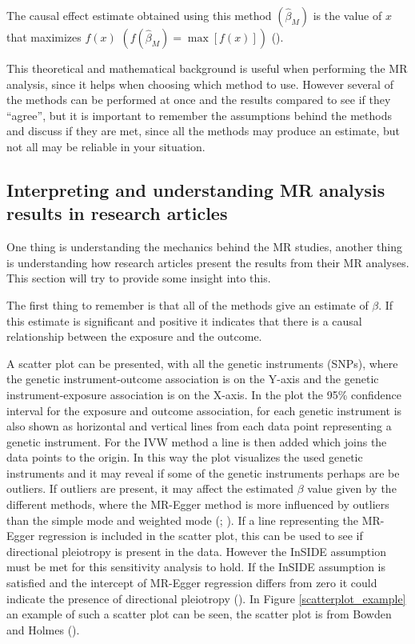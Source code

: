 \documentclass[
]{article}
\begin{document}
The causal effect estimate obtained using this method \((\hat\beta_M)\)
is the value of \(x\) that maximizes \(f(x)\)
\(\left(f\left(\hat\beta_M\right)=\max[f(x)]\right)\)
().

This theoretical and mathematical background is useful when performing
the MR analysis, since it helps when choosing which method to use.
However several of the methods can be performed at once and the results
compared to see if they ``agree'', but it is important to remember the
assumptions behind the methods and discuss if they are met, since all
the methods may produce an estimate, but not all may be reliable in your
situation.

\subsection{Interpreting and understanding MR analysis results in
research
articles}\label{interpreting-and-understanding-mr-analysis-results-in-research-articles}

One thing is understanding the mechanics behind the MR studies, another
thing is understanding how research articles present the results from
their MR analyses. This section will try to provide some insight into
this.

The first thing to remember is that all of the methods give an estimate
of \(\beta\). If this estimate is significant and positive it indicates
that there is a causal relationship between the exposure and the
outcome.

A scatter plot can be presented, with all the genetic instruments
(SNPs), where the genetic instrument-outcome association is on the
Y-axis and the genetic instrument-exposure association is on the X-axis.
In the plot the 95\% confidence interval for the exposure and outcome
association, for each genetic instrument is also shown as horizontal and
vertical lines from each data point representing a genetic instrument.
For the IVW method a line is then added which joins the data points to
the origin. In this way the plot visualizes the used genetic instruments
and it may reveal if some of the genetic instruments perhaps are be
outliers. If outliers are present, it may affect the estimated \(\beta\)
value given by the different methods, where the MR-Egger method is more
influenced by outliers than the simple mode and weighted mode
(;
). If a line
representing the MR-Egger regression is included in the scatter plot,
this can be used to see if directional pleiotropy is present in the
data. However the InSIDE assumption must be met for this sensitivity
analysis to hold. If the InSIDE assumption is satisfied and the
intercept of MR-Egger regression differs from zero it could indicate the
presence of directional pleiotropy (). In Figure \ref{scatterplot_example} an example of such a
scatter plot can be seen, the scatter plot is from Bowden and Holmes
().
\end{document}
